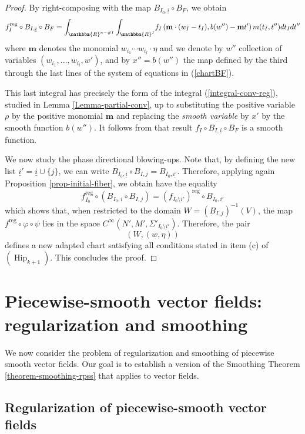 \documentclass[11pt,psamsfonts]{article}
\newcommand{\tmop}[1]{\ensuremath{\operatorname{#1}}}
\theoremstyle{definition}
\theoremstyle{remark}
\newcommand{\cR}{\ensuremath{\mathbbm{R}}}
\newcommand{\reg}{\mathrm{reg}}
\newcommand{\mon}{\mathbf{m}}
\begin{document}
\begin{proof}
  By right-composing with the
  map $B_{I_0, \underline{i}} \circ B_F$, we obtain
  \[ f_I^{\reg} \circ B_{I, \underline{i}} \circ B_F =
     \int_{\cR^{n -\#I}} {\int_{\cR^I}}  f_I \left( \mon \cdot
     (w_I - t_I), b (w'') - \mon t' \right) m (t_I, t'') d t_I d t'' \]
  where $\mon$ denotes the monomial $w_{i_1} \cdots w_{i_l} \cdot \eta$ and we
  denote by $w''$ collection of variables $(w_{i_1}, \ldots, w_{i_l}, w')$,
  and by $x'' = b (w'')$ the map defined by the third through the last lines
  of the system of equations in (\ref{chartBF}). 
  
 This last integral has precisely the form of the integral (\ref{integral-conv-reg}), studied in Lemma \ref{Lemma-partial-conv}, up to substituting the positive variable $\rho$ by the positive monomial $\mon$ and replacing the {\em smooth variable} by $x'$ by the smooth function $b(w'')$.  It follows
  from that result $f_I \circ B_{I, \underline{i}} \circ B_F$ is a smooth
  function.
  
 We now study the phase directional blowing-ups.  
 Note that, by defining the new list $\underline{i}' = \underline{i} \cup \{ j \}$, we can write
  $B_{I_0, \underline{i}} \circ B_{I, j} = B_{I_0, \underline{i'}}$. Therefore, applying again Proposition \ref{prop-initial-fiber}, we obtain
  have the equality
  \[ f_{I_0}^{\reg} \circ \left( B_{I_0, \underline{i}} \circ B_{I, j}
     \right) = ( f_{I_0 \setminus \underline{i}'} )^{\reg}\circ B_{I_0,
     \underline{i'}}  \]
  which shows that, when restricted to the domain $W = (B_{I, j})^{- 1} (V)$,
  the map $f^{\reg} \circ \varphi \circ \psi$ lies in the space $C^{\infty} \left(
  N', M',\Sigma'_{I_0 \setminus \underline{i}'} \right)$. Therefore, the pair
  \[ (W, (w, \eta)) \]
  defines a new adapted chart satisfying all conditions stated in item (c) of
  $(\tmop{Hip}_{k + 1})$.  This concludes the proof.
\end{proof}
\section{Piecewise-smooth vector fields: regularization and smoothing}\label{s6}
We now consider the problem of regularization and smoothing of piecewise smooth vector fields. Our goal is to establish a version of the Smoothing Theorem \ref{theorem-smoothing-rpss}  that applies to vector fields.  
\subsection{Regularization of piecewise-smooth vector fields}\label{subsect-reg-vf}
\end{document}
